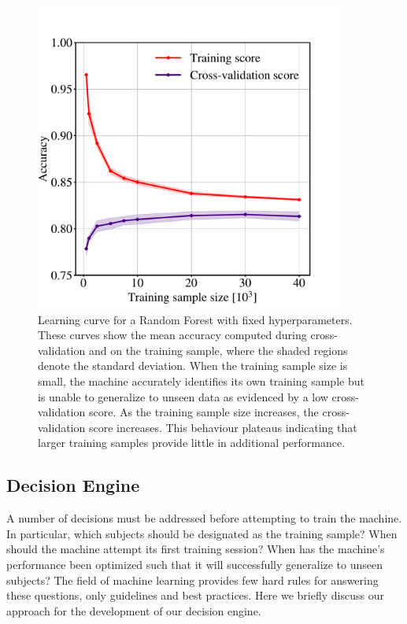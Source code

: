 \begin{figure}[t!]
\centering
\includegraphics[width=4in]{Figures/human_machine/f9.pdf}
\caption[Random Forest learning curve]{Learning curve for a Random Forest with fixed hyperparameters. These curves show the mean accuracy computed during cross-validation and on the training sample, where the shaded regions denote the standard deviation. When the training sample size is small, the machine accurately identifies its own training sample but is unable to generalize to unseen data as evidenced by a low cross-validation score. As the training sample size increases, the cross-validation score increases. This behaviour plateaus indicating that larger training samples provide little in additional performance. \label{fig: learning curve}}
\end{figure}


\subsection{Decision Engine}\label{chap4: decision engine}
A number of decisions must be addressed before attempting to train the machine. 
In particular, which subjects should be designated as the training sample? 
When should the machine attempt its first training session? 
When has the machine's performance been optimized such that it will successfully
generalize to unseen subjects? The field of machine learning provides few hard rules 
for answering these questions, only guidelines and best practices. 
Here we briefly discuss our approach for the development of our decision engine.


